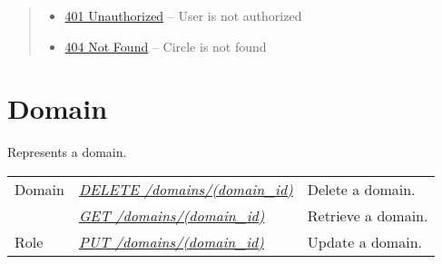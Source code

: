 \documentclass[letterpaper,10pt,english]{sphinxmanual}
\begin{document}
\begin{fulllineitems}
\begin{quote}
\begin{description}
\begin{itemize}
\item {} 
\href{http://www.w3.org/Protocols/rfc2616/rfc2616-sec10.html\#sec10.4.2}{401 Unauthorized} -- User is not authorized

\item {} 
\href{http://www.w3.org/Protocols/rfc2616/rfc2616-sec10.html\#sec10.4.5}{404 Not Found} -- Circle is not found

\end{itemize}

\end{description}\end{quote}

\end{fulllineitems}



\section{Domain}
\label{\detokenize{resources/domain::doc}}\label{\detokenize{resources/domain:id1}}\label{\detokenize{resources/domain:domain}}
Represents a domain.

\noindent\begin{tabulary}{\linewidth}{|L|L|L|}
\hline
{}\relax &\relax &\relax \\
\hline
Domain
&
{\hyperref[\detokenize{resources/domain:delete--domains-(domain_id)}]{\emph{DELETE /domains/(domain\_id)}}}
&
Delete a domain.
\\
\hline&
{\hyperref[\detokenize{resources/domain:get--domains-(domain_id)}]{\emph{GET /domains/(domain\_id)}}}
&
Retrieve a domain.
\\
\hline
Role
&
{\hyperref[\detokenize{resources/domain:put--domains-(domain_id)}]{\emph{PUT /domains/(domain\_id)}}}
&
Update a domain.
\\
\hline\end{tabulary}


\begin{DUlineblock}{0em}
\item[] 
\end{DUlineblock}
\end{document}
